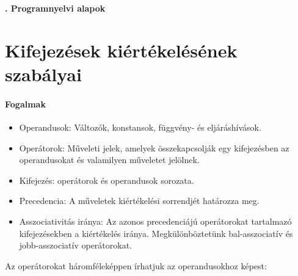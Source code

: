 \documentclass[12pt,margin=0px]{article}
\date{}
\begin{document}
    \begin{center}
        {\Large\bfseries{}. Programnyelvi alapok} \\
    \end{center}
	
	\section{Kifejezések kiértékelésének szabályai}
	
	\paragraph*{Fogalmak}
	\begin{itemize}
		\item	Operandusok: Változók, konstansok, függvény- és eljáráshívások.
		
		\item	Operátorok: Műveleti jelek, amelyek összekapcsolják egy kifejezésben az operandusokat és valamilyen
		műveletet jelölnek.
		
		\item	Kifejezés: operátorok és operandusok sorozata.
		
		\item	Precedencia: A műveletek kiértékelési sorrendjét határozza meg.
		
		\item	Asszociativitás iránya: Az azonos precedenciájú operátorokat tartalmazó kifejezésekben a kiértékelés iránya.
		Megkülönböztetünk bal-asszociatív és jobb-asszociatív operátorokat.
	\end{itemize}
	
	\noindent Az operátorokat háromféleképpen írhatjuk az operandusokhoz képest:
	
\end{document}
